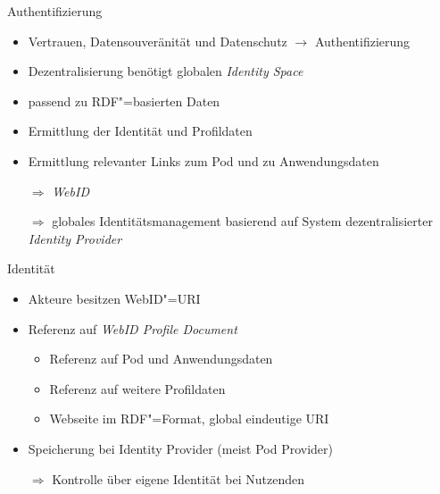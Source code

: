 \begin{frame}{Authentifizierung \footnotesize\cite{sambraSolidPlatformDecentralized2016}}
    \begin{itemize}
        \item Vertrauen, Datensouveränität und Datenschutz $\to$ Authentifizierung
        \item Dezentralisierung benötigt globalen \emph{Identity Space}
        
        \pause
        \item passend zu RDF"=basierten Daten
        \item Ermittlung der Identität und Profildaten
        \item Ermittlung relevanter Links zum Pod und zu Anwendungsdaten
        
        \pause
        \item[$\Rightarrow$] \emph{WebID}
        \item[$\Rightarrow$] globales Identitätsmanagement basierend auf System dezentralisierter \emph{Identity Provider}
    \end{itemize}
\end{frame}


\begin{frame}{Identität}
    \begin{itemize}
        \item Akteure besitzen WebID"=URI~\cite{sambraSolidPlatformDecentralized2016}
        
        \item Referenz auf \emph{WebID Profile Document}~\cite{sambraSolidPlatformDecentralized2016,solidcommunitygroupSolidemblemsvg2019}
        \begin{itemize}
            \item Referenz auf Pod und Anwendungsdaten~\cite{solidcommunitygroupSolidWebIDProfile2024}
            \item Referenz auf weitere Profildaten~\cite{solidcommunitygroupSolidWebIDProfile2024}
            \item Webseite im RDF"=Format, global eindeutige URI~\cite{sambraSolidPlatformDecentralized2016}
        \end{itemize}
        
        \item Speicherung bei Identity Provider (meist Pod Provider)~\cite{sambraSolidPlatformDecentralized2016}
        \item[$\Rightarrow$] Kontrolle über eigene Identität bei Nutzenden~\cite{sambraSolidPlatformDecentralized2016}
    \end{itemize}
\end{frame}


